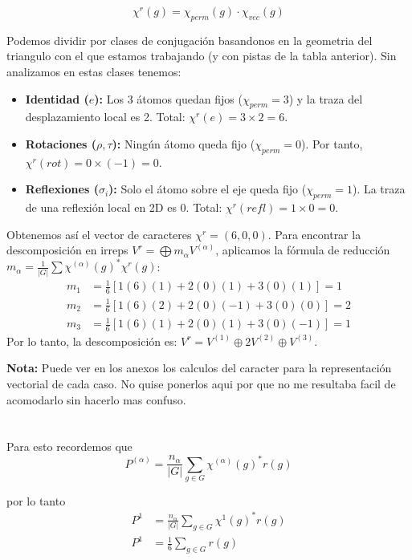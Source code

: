 \documentclass[12pt]{amsart}
\begin{document}
$$\chi^r(g) = \chi_{perm}(g) \cdot \chi_{vec}(g)$$

Podemos dividir por clases de conjugación basandonos en la geometria del triangulo con el que estamos trabajando (y con pistas de la tabla anterior). Sin analizamos en estas clases tenemos:

\begin{itemize}
  \item \textbf{Identidad ($e$):} Los 3 átomos quedan fijos ($\chi_{perm}=3$) y la traza del desplazamiento local es 2. Total: $\chi^r(e) = 3 \times 2 = 6$.
  \item \textbf{Rotaciones ($\rho, \tau$):} Ningún átomo queda fijo ($\chi_{perm}=0$). Por tanto, $\chi^r(rot) = 0 \times (-1) = 0$.
  \item \textbf{Reflexiones ($\sigma_i$):} Solo el átomo sobre el eje queda fijo ($\chi_{perm}=1$). La traza de una reflexión local en 2D es 0. Total: $\chi^r(refl) = 1 \times 0 = 0$.
\end{itemize}

Obtenemos así el vector de caracteres $\chi^r = (6, 0, 0)$. Para encontrar la descomposición en irreps $V^r = \bigoplus m_\alpha V^{(\alpha)}$, aplicamos la fórmula de reducción $m_\alpha = \frac{1}{|G|} \sum \chi^{(\alpha)}(g)^* \chi^r(g)$:
\begin{align*}
m_1 &= \frac{1}{6} [ 1(6)(1) + 2(0)(1) + 3(0)(1) ] = 1 \\
m_2 &= \frac{1}{6} [ 1(6)(2) + 2(0)(-1) + 3(0)(0) ] = 2 \\
m_3 &= \frac{1}{6} [ 1(6)(1) + 2(0)(1) + 3(0)(-1) ] = 1
\end{align*}
Por lo tanto, la descomposición es: $V^r = V^{(1)} \oplus 2V^{(2)} \oplus V^{(3)}$.

\textbf{Nota:} Puede ver en los anexos los calculos del caracter para la representación vectorial de cada caso. No quise ponerlos aqui por que no me resultaba facil de acomodarlo sin hacerlo mas confuso.

\section{} \label{lab:sec-9}

Para esto recordemos que
\begin{equation}
  P^{(\alpha)} = \frac{n_\alpha}{\left|G\right|} \sum_{g \in G} \chi^{(\alpha)}(g)^*r(g)
\end{equation}

por lo tanto
\begin{align*}
  P^{1} &= \frac{n_\alpha}{\left|G\right|} \sum_{g \in G} \chi^{1}(g)^*r(g)\\
  P^{1} &= \frac{1}{6} \sum_{g \in G} r(g)\\
\end{align*}
\end{document}
